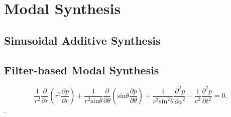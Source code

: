 \section{Modal Synthesis}\label{sec:modal_synth}
\mbox{}\par 


\subsection{Sinusoidal Additive Synthesis}\label{sec:sin_synth}
\mbox{}\par
\subsection{Filter-based Modal Synthesis}\label{sec:add_synth}
\mbox{}\par

\begin{equation}\label{eq:spherical_wave}
 \frac{1}{r^2}\frac{\partial}{\partial r}(r^2 \frac{\partial p}{\partial r})+\frac{1}{r^2 \text{sin}\theta}\frac{\partial}{\partial \theta}(\text{sin}\theta\frac{\partial p}{\partial \theta}) + \frac{1}{r^2 \text{sin}^2\theta}\frac{\partial^2 p}{\partial \phi^2}-\frac{1}{c^2}\frac{\partial^2 p}{\partial t^2} = 0.
\end{equation}
 \cite{bib:fourierAcoustics}.